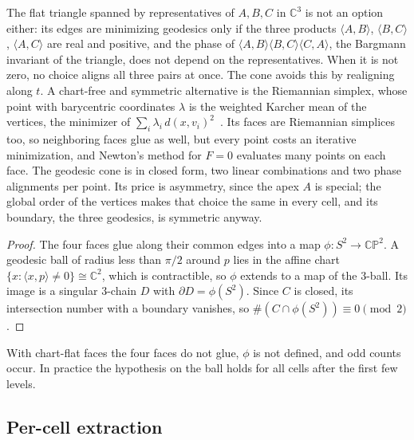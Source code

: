 \documentclass[11pt]{article}
\theoremstyle{plain}
\newtheorem{proposition}[theorem]{Proposition}
\theoremstyle{definition}
\theoremstyle{remark}
\newcommand{\CP}{\mathbb{CP}}
\newcommand{\C}{\mathbb{C}}
\begin{document}
The flat triangle spanned by representatives of $A,B,C$ in $\C^3$ is
not an option either: its edges are minimizing geodesics only if the
three products $\langle A,B\rangle$, $\langle B,C\rangle$,
$\langle A,C\rangle$ are real and positive, and the phase of
$\langle A,B\rangle\langle B,C\rangle\langle C,A\rangle$, the Bargmann
invariant of the triangle, does not depend on the representatives. When
it is not zero, no choice aligns all three pairs at once. The cone
avoids this by realigning along $t$. A chart-free and symmetric
alternative is the Riemannian simplex, whose point with barycentric
coordinates $\lambda$ is the weighted Karcher mean of the vertices, the
minimizer of $\sum_i\lambda_i\,d(x,v_i)^2$~\cite{sander2012,dvw2015}.
Its faces are Riemannian simplices too, so neighboring faces glue as
well, but every point costs an iterative minimization, and Newton's
method for $F=0$ evaluates many points on each face. The geodesic cone
is in closed form, two linear combinations and two phase alignments per
point. Its price is asymmetry, since the apex $A$ is special; the global
order of the vertices makes that choice the same in every cell, and its
boundary, the three geodesics, is symmetric anyway.


\begin{proof}
The four faces glue along their common edges into a map
$\phi:S^2\to\CP^2$. A geodesic ball of radius less than $\pi/2$ around
$p$ lies in the affine chart $\{x:\langle x,p\rangle\ne0\}\cong\C^2$, which
is contractible, so $\phi$ extends to a map of the $3$-ball. Its image is
a singular $3$-chain $D$ with $\partial D=\phi(S^2)$. Since $C$ is closed,
its intersection number with a boundary vanishes, so
$\#(C\cap\phi(S^2))\equiv0\pmod 2$.
\end{proof}

With chart-flat faces the four faces do not glue, $\phi$ is not defined,
and odd counts occur. In practice the hypothesis on the ball holds for
all cells after the first few levels.

\subsection{Per-cell extraction}
\end{document}
